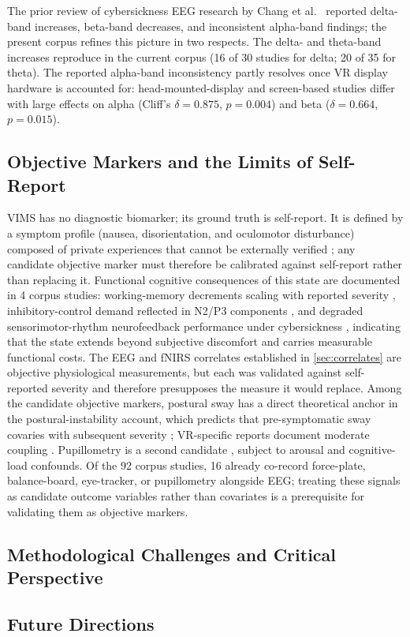 The prior review of cybersickness EEG research by Chang et al.~\cite{changBrainActivityCybersickness2023} reported delta-band increases, beta-band decreases, and inconsistent alpha-band findings; the present corpus refines this picture in two respects.
The delta- and theta-band increases reproduce in the current corpus (16 of 30 studies for delta; 20 of 35 for theta).
The reported alpha-band inconsistency partly resolves once VR display hardware is accounted for: head-mounted-display and screen-based studies differ with large effects on alpha (Cliff's $\delta = 0.875$, $p = 0.004$) and beta ($\delta = 0.664$, $p = 0.015$).

\subsection{Objective Markers and the Limits of Self-Report}\label{sec:objective-markers}
VIMS has no diagnostic biomarker; its ground truth is self-report.
It is defined by a symptom profile (nausea, disorientation, and oculomotor disturbance) composed of private experiences that cannot be externally verified \cite{kennedySimulatorSicknessQuestionnaire1993, stanneyCybersicknessNotSimulator1997}; any candidate objective marker must therefore be calibrated against self-report rather than replacing it.
Functional cognitive consequences of this state are documented in 4 corpus studies: working-memory decrements scaling with reported severity \cite{mimnaughVirtualRealitySickness2023}, inhibitory-control demand reflected in N2/P3 components \cite{wuInhibitionrelatedN2P32020}, and degraded sensorimotor-rhythm neurofeedback performance under cybersickness \cite{bergerInfluencePlaceboTDCS2024, bergerManipulatingCybersicknessVirtual2025}, indicating that the state extends beyond subjective discomfort and carries measurable functional costs.
The EEG and fNIRS correlates established in \autoref{sec:correlates} are objective physiological measurements, but each was validated against self-reported severity and therefore presupposes the measure it would replace.
Among the candidate objective markers, postural sway has a direct theoretical anchor in the postural-instability account, which predicts that pre-symptomatic sway covaries with subsequent severity \cite{riccioEcologicalTheoryMotion1991, stoffregenPosturalInstabilityPrecedes1998}; VR-specific reports document moderate coupling \cite{palmisanoSpontaneousPosturalSway2014, dennisonImprovingMotionSickness2019, teixeiraInvestigatingRelativeContributions2024}.
Pupillometry is a second candidate \cite{kourtesisCybersicknessVirtualReality2023, kourtesisCybersicknessCognitionMotor2023}, subject to arousal and cognitive-load confounds.
Of the 92 corpus studies, 16 already co-record force-plate, balance-board, eye-tracker, or pupillometry alongside EEG; treating these signals as candidate outcome variables rather than covariates is a prerequisite for validating them as objective markers.

\subsection{Methodological Challenges and Critical Perspective}\label{sec:challenges}


\subsection{Future Directions}\label{sec:future}

